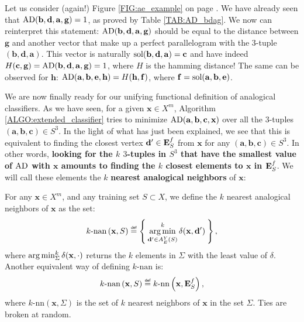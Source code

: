 \begin{testexample}
Let us consider (again!) Figure \ref{FIG:ae_example} on page
\pageref{FIG:ae_example}. We have already seen that $\text{AD}(\mathbf{b},
\mathbf{d}, \mathbf{a}, \mathbf{g}) = 1$, as proved by Table \ref{TAB:AD_bdag}.
We now can reinterpret this statement: $\text{AD}(\mathbf{b}, \mathbf{d}, \mathbf{a},
\mathbf{g})$ should be equal to the distance between $\mathbf{g}$ and another
vector that make up a perfect parallelogram with the $3$-tuple
$(\mathbf{b},\mathbf{d}, \mathbf{a})$. This vector is naturally
$\text{sol}(\mathbf{b},\mathbf{d}, \mathbf{a}) = \mathbf{c}$ and have indeed
$H(\mathbf{c}, \mathbf{g}) =  \text{AD}(\mathbf{b}, \mathbf{d}, \mathbf{a},
\mathbf{g}) = 1$, where $H$ is the hamming distance! The same can be observed
for $\mathbf{h}$: $\text{AD}(\mathbf{a}, \mathbf{b}, \mathbf{e}, \mathbf{h}) =
H(\mathbf{h}, \mathbf{f})$, where $\mathbf{f} = \text{sol}(\mathbf{a}, \mathbf{b},
\mathbf{e})$.
\end{testexample}

We are now finally ready for our unifying functional definition of analogical
classifiers. As we have seen, for a given $\mathbf{x} \in X^m$, Algorithm
\ref{ALGO:extended_classifier} tries to minimize
$\text{AD}(\mathbf{a},\mathbf{b},\mathbf{c},\mathbf{x})$ over all the $3$-tuples
$(\mathbf{a},\mathbf{b},\mathbf{c}) \in S^3$. In the light of what has just
been explained, we see that this is equivalent to finding the closest vertex
$\mathbf{d}' \in \mathbf{E}_{S}^{f}$ from $\mathbf{x}$ for any $(\mathbf{a}, \mathbf{b},
\mathbf{c}) \in S^3$. In other words, \textbf{looking for the $k$ $3$-tuples in
$S^3$ that have the smallest value of $\text{AD}$ with $\mathbf{x}$ amounts to
finding the $k$ closest elements to $\mathbf{x}$ in $\mathbf{E}_{S}^{f}$}. We will call these
elements the $k$ \textbf{nearest analogical neighbors} of $\mathbf{x}$:

\begin{definition}
  \label{DEF:knan}
  For any $\mathbf{x} \in X^m$, and any training set $S \subset X$, we define
  the $k$ nearest analogical neighbors of $\mathbf{x}$ as the set:
  $$k\text{-nan}\left(\mathbf{x}, S\right) \eqdef \Set{\argmin_{\mathbf{d}' \in
  A_E^Y(S)}^k
  \delta(\mathbf{x},\mathbf{d}')},
  $$
  where $\operatorname*{arg\,min}_{\Sigma}^k \delta(\mathbf{x}, \cdot)$ returns the $k$ elements in $\Sigma$
  with the least value of $\delta$.
  Another equivalent way of defining $k\text{-nan}$ is:
  $$k\text{-nan}\left(\mathbf{x}, S\right) \eqdef k\text{-nn}\left(\mathbf{x},
  \esf\right),$$
  where $k\text{-nn}\left(\mathbf{x},\Sigma\right)$ is the set of $k$ nearest
  neighbors of $\mathbf{x}$ in the set $\Sigma$. Ties are broken at random.
\end{definition}

